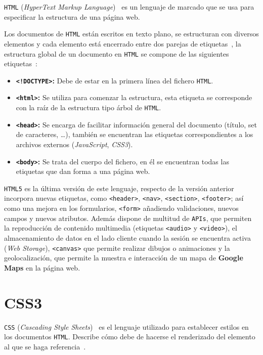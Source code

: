 \documentclass[a4paper, 12pt]{book}
\begin{document}
\texttt{HTML} (\textit{HyperText Markup Language})~\cite{mdnhtml} es un lenguaje de marcado que se usa para especificar la estructura de una página web.

Los documentos de \texttt{HTML} están escritos en texto plano, se estructuran con diversos elementos y cada elemento está encerrado entre dos parejas de etiquetas~\cite{mdnhtml}, la estructura global de un documento en \texttt{HTML} se compone de las siguientes etiquetas~\cite{gauchat2012gran}:

\begin{itemize}
	\item \textbf{\texttt{<!DOCTYPE>}:} Debe de estar en la primera línea del fichero \texttt{HTML}.
	\item \textbf{\texttt{<html>}:} Se utiliza para comenzar la estructura, esta etiqueta se corresponde con la raíz de la estructura tipo árbol de \texttt{HTML}.
	\item \textbf{\texttt{<head>}:} Se encarga de facilitar información general del documento (título, set de caracteres, \ldots), también se encuentran las etiquetas correspondientes a los archivos externos (\textit{JavaScript}, \textit{CSS3}).
	\item \textbf{\texttt{<body>}:} Se trata del cuerpo del fichero, en él se encuentran todas las etiquetas que dan forma a una página web.
\end{itemize}

\texttt{HTML5} es la última versión de este lenguaje, respecto de la versión anterior incorpora nuevas etiquetas, como \texttt{<header>}, \texttt{<nav>}, \texttt{<section>}, \texttt{<footer>}; así como una mejora en los formularios, \texttt{<form>} añadiendo validaciones, nuevos campos y nuevos atributos. Además dispone de multitud de \texttt{APIs}, que permiten la reproducción de contenido multimedia (etiquetas \texttt{<audio>} y \texttt{<video>}), el almacenamiento de datos en el lado cliente cuando la sesión se encuentra activa (\textit{Web Storage}), \texttt{<canvas>} que permite realizar dibujos o animaciones y la geolocalización, que permite la muestra e interacción de un mapa de \textbf{Google Maps} en la página web.

\section{CSS3}
\label{sec:css3}

\texttt{CSS} (\textit{Cascading Style Sheets})~\cite{mdncss} es el lenguaje utilizado para establecer estilos en los documentos \texttt{HTML}. Describe cómo debe de hacerse el renderizado del elemento al que se haga referencia~\cite{mdncss}.
\end{document}
